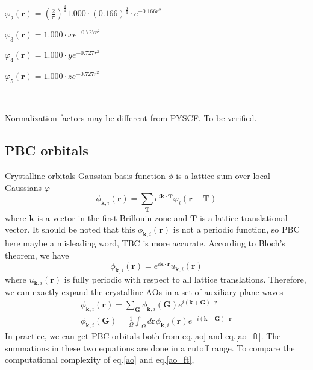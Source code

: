\documentclass{article}
\begin{document}
        $ \varphi_2(\textbf{r}) = \left(\frac{2}{\pi}\right)^{\frac{3}{4}}
            1.000\cdot(0.166)^{\frac{3}{4}}\cdot e^{-0.166r^2} $

        $ \varphi_3(\textbf{r}) = 1.000\cdot x e^{-0.727r^2} $

        $ \varphi_4(\textbf{r}) = 1.000\cdot y e^{-0.727r^2} $

        $ \varphi_5(\textbf{r}) = 1.000\cdot z e^{-0.727r^2} $
        \hrule
        ~\\
        Normalization factors may be different from \href{https://pyscf.org/}{PYSCF}. To be verified.
        
    \subsection{PBC orbitals}
    Crystalline orbitals Gaussian basis function $\phi$ is a lattice sum over local Gaussians $\varphi$
    \begin{equation}
        \phi_{\textbf{k},i}(\textbf{r}) = \sum_{\textbf{T}}e^{i\textbf{k}\cdot\textbf{T}}\varphi_i(\textbf{r}-\textbf{T})\label{ao}
    \end{equation}
    where $\textbf{k}$ is a vector in the first Brillouin zone and $\textbf{T}$ is a lattice translational vector.
    It should be noted that this $\phi_{\textbf{k},i}(\textbf{r})$ is not a periodic function, 
    so PBC here maybe a misleading word, TBC is more accurate.
    According to Bloch's theorem, we have
    \begin{equation}
        \phi_{\textbf{k},i}(\textbf{r}) = e^{i\textbf{k}\cdot\textbf{r}}u_{\textbf{k},i}(\textbf{r})
    \end{equation}
    where $u_{\textbf{k},i}(\textbf{r})$ is fully periodic with respect to all lattice translations.
    Therefore, we can exactly expand the crystalline AOs in a set of auxiliary plane-waves
    \begin{gather}
        \phi_{\textbf{k},i}(\textbf{r}) = \sum_{\textbf{G}}\phi_{\textbf{k},i}(\textbf{G})e^{i(\textbf{k}+\textbf{G})\cdot\textbf{r}}\label{ao_ft}\\
        \phi_{\textbf{k},i}(\textbf{G}) = \frac{1}{\Omega}\int_\Omega d\textbf{r}\phi_{\textbf{k},i}(\textbf{r})e^{-i(\textbf{k}+\textbf{G})\cdot\textbf{r}}\label{ao_ft_coeff}
    \end{gather}
    In practice, we can get PBC orbitals both from eq.\eqref{ao} and eq.\eqref{ao_ft}. 
    The summations in these two equations are done in a cutoff range.
    To compare the computational complexity of eq.\eqref{ao} and eq.\eqref{ao_ft}, 
\end{document}
